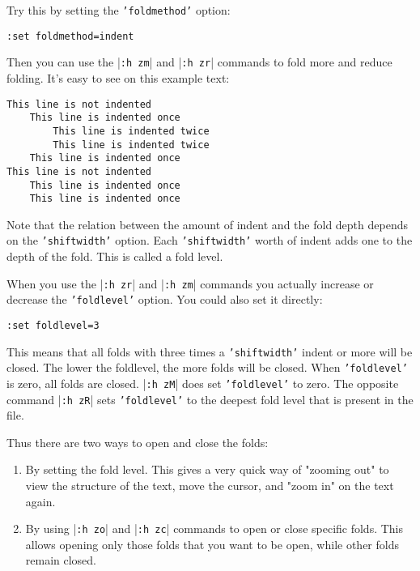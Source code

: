 Try this by setting the \texttt{'foldmethod'} option:

\begin{Verbatim}[samepage=true]
 :set foldmethod=indent
\end{Verbatim}

Then you can use the |\texttt{:h zm}| and |\texttt{:h zr}| commands to fold more and reduce folding.
It's easy to see on this example text:

\begin{Verbatim}[samepage=true]
This line is not indented
    This line is indented once
        This line is indented twice
        This line is indented twice
    This line is indented once
This line is not indented
    This line is indented once
    This line is indented once
\end{Verbatim}

Note that the relation between the amount of indent and the fold depth depends on the \texttt{'shiftwidth'} option.
Each \texttt{'shiftwidth'} worth of indent adds one to the depth of the fold.
This is called a fold level.

When you use the |\texttt{:h zr}| and |\texttt{:h zm}| commands you actually increase or decrease the \texttt{'foldlevel'} option.
You could also set it directly:

\begin{Verbatim}[samepage=true]
 :set foldlevel=3
\end{Verbatim}

This means that all folds with three times a \texttt{'shiftwidth'} indent or more will be closed.
The lower the foldlevel, the more folds will be closed.
When \texttt{'foldlevel'} is zero, all folds are closed.
|\texttt{:h zM}| does set \texttt{'foldlevel'} to zero.
The opposite command |\texttt{:h zR}| sets \texttt{'foldlevel'} to the deepest fold level that is present in the file.

Thus there are two ways to open and close the folds:
\begin{enumerate}
\item By setting the fold level.
This gives a very quick way of "zooming out" to view the structure of the text, move the cursor, and "zoom in" on the text again.

\item By using |\texttt{:h zo}| and |\texttt{:h zc}| commands to open or close specific folds.
This allows opening only those folds that you want to be open, while other folds remain closed.
\end{enumerate}

